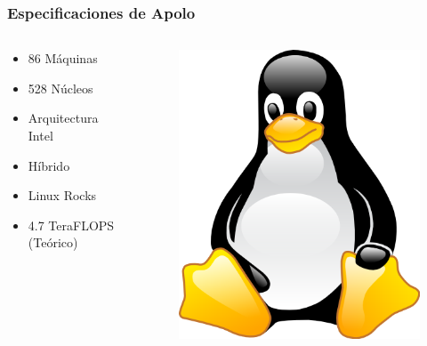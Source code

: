 \begin{frame}
\frametitle{Especificaciones de Apolo}
  \begin{columns}
    \begin{column}[ht]{5cm}
      \begin{itemize}
      \item 86 Máquinas
      \item 528 Núcleos
      \item Arquitectura Intel
      \item Híbrido
      \item Linux Rocks
      \item 4.7 TeraFLOPS (Teórico)
      \end{itemize}
    \end{column}
    \begin{column}[ht]{5cm}
      \begin{figure}[ht]
        \centering
        \includegraphics[scale=0.35]{imgs/tux}
      \end{figure}
    \end{column}
  \end{columns}
\end{frame}

